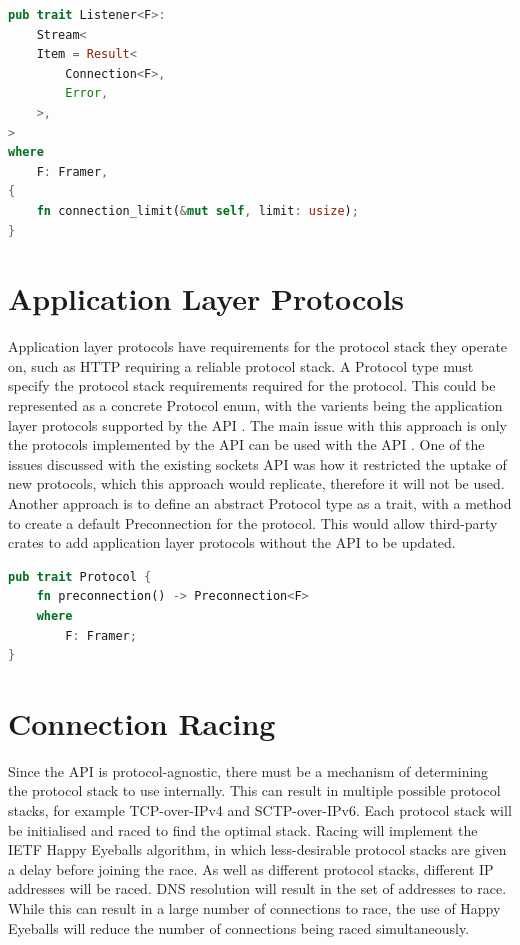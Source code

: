 \documentclass{l4proj}
\begin{document}
\begin{lstlisting}[language=Rust, float=h, label=lst:listener, caption={The Listener trait, showing the Stream
    implementation requirement for all implementers.}]
pub trait Listener<F>:
    Stream<
    Item = Result<
        Connection<F>,
        Error,
    >,
>
where
    F: Framer,
{
    fn connection_limit(&mut self, limit: usize);
}

\end{lstlisting}

\section{Application Layer Protocols}
Application layer protocols have requirements for the protocol stack they operate on, such as HTTP requiring a reliable
protocol stack.
A Protocol type must specify the protocol stack requirements required for the protocol.
This could be represented as a concrete Protocol enum, with the varients being the application layer protocols supported
by the API .
The main issue with this approach is only the protocols implemented by the API can be used with the API .
One of the issues discussed with the existing sockets API was how it restricted the uptake of new protocols, which this
approach would replicate, therefore it will not be used.
Another approach is to define an abstract Protocol type as a trait, with a method to create a default Preconnection for
the protocol.
This would allow third-party crates to add application layer protocols without the API to be updated.

\begin{lstlisting}[language=Rust, float=h, label=lst:protocol, caption={The Protocol trait, add more info here}]
pub trait Protocol {
    fn preconnection() -> Preconnection<F>
    where
        F: Framer;
}
\end{lstlisting}


\section{Connection Racing}
Since the API is protocol-agnostic, there must be a mechanism of determining the protocol stack to use internally.
This can result in multiple possible protocol stacks, for example TCP-over-IPv4 and SCTP-over-IPv6.
Each protocol stack will be initialised and raced to find the optimal stack.
Racing will implement the IETF Happy Eyeballs algorithm, in which less-desirable protocol stacks are given a delay
before joining the race.
As well as different protocol stacks, different IP addresses will be raced.
DNS resolution will result in the set of addresses to race.
While this can result in a large number of connections to race, the use of Happy Eyeballs will reduce the number of
connections being raced simultaneously.
\end{document}
